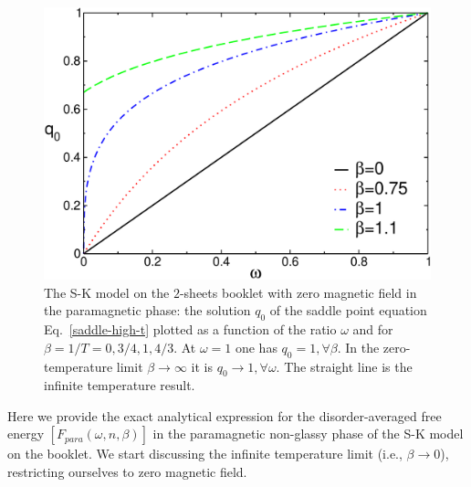\documentclass[twocolumn,superscriptaddress,prb,10pt]{revtex4-1}
\begin{document}
\begin{figure}[t]
\includegraphics*[width=0.9\linewidth]{./draft_figs/RSB0_saddle_ht}
\caption{
 The S-K model on the $2$-sheets booklet with zero magnetic field in the 
 paramagnetic phase: the solution $q_0$ of the saddle point equation 
 Eq.~\eqref{saddle-high-t} plotted as a function of the ratio 
 $\omega$ and for $\beta=1/T=0,3/4,1,4/3$. At $\omega=1$ one has 
 $q_0=1,\forall\beta$. In the zero-temperature limit $\beta\to\infty$ 
 it is $q_0\to 1,\forall\omega$. The straight line is the infinite 
 temperature result. 
}
\label{RSB0_saddle_ht}
\end{figure}

Here we provide the exact analytical expression for the disorder-averaged free 
energy $[F_{para}(\omega,n,\beta)]$  in the paramagnetic non-glassy phase of 
the S-K model on the booklet. We start discussing the infinite temperature 
limit (i.e., $\beta\to 0$), restricting ourselves to zero magnetic field. 
\end{document}
